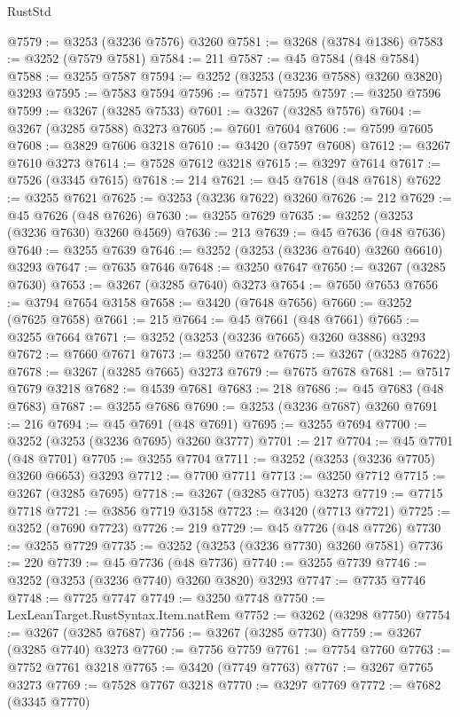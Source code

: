 \begin{lexlean}{RustStd}
\begin{coremodule}
{\begin{coremodule}
{{{{{{{{{{{{{{{{{{{{{{{{{{{{{{{{{{{{{{{@7579 := @3253 (@3236 @7576) @3260
@7581 := @3268 (@3784 @1386)
@7583 := @3252 (@7579 @7581)
@7584 := 211
@7587 := @45 @7584 (@48 @7584)
@7588 := @3255 @7587
@7594 := @3252 (@3253 (@3236 @7588) @3260 @3820) @3293
@7595 := @7583 @7594
@7596 := @7571 @7595
@7597 := @3250 @7596
@7599 := @3267 (@3285 @7533)
@7601 := @3267 (@3285 @7576)
@7604 := @3267 (@3285 @7588) @3273
@7605 := @7601 @7604
@7606 := @7599 @7605
@7608 := @3829 @7606 @3218
@7610 := @3420 (@7597 @7608)
@7612 := @3267 @7610 @3273
@7614 := @7528 @7612 @3218
@7615 := @3297 @7614
@7617 := @7526 (@3345 @7615)
@7618 := 214
@7621 := @45 @7618 (@48 @7618)
@7622 := @3255 @7621
@7625 := @3253 (@3236 @7622) @3260
@7626 := 212
@7629 := @45 @7626 (@48 @7626)
@7630 := @3255 @7629
@7635 := @3252 (@3253 (@3236 @7630) @3260 @4569)
@7636 := 213
@7639 := @45 @7636 (@48 @7636)
@7640 := @3255 @7639
@7646 := @3252 (@3253 (@3236 @7640) @3260 @6610) @3293
@7647 := @7635 @7646
@7648 := @3250 @7647
@7650 := @3267 (@3285 @7630)
@7653 := @3267 (@3285 @7640) @3273
@7654 := @7650 @7653
@7656 := @3794 @7654 @3158
@7658 := @3420 (@7648 @7656)
@7660 := @3252 (@7625 @7658)
@7661 := 215
@7664 := @45 @7661 (@48 @7661)
@7665 := @3255 @7664
@7671 := @3252 (@3253 (@3236 @7665) @3260 @3886) @3293
@7672 := @7660 @7671
@7673 := @3250 @7672
@7675 := @3267 (@3285 @7622)
@7678 := @3267 (@3285 @7665) @3273
@7679 := @7675 @7678
@7681 := @7517 @7679 @3218
@7682 := @4539 @7681
@7683 := 218
@7686 := @45 @7683 (@48 @7683)
@7687 := @3255 @7686
@7690 := @3253 (@3236 @7687) @3260
@7691 := 216
@7694 := @45 @7691 (@48 @7691)
@7695 := @3255 @7694
@7700 := @3252 (@3253 (@3236 @7695) @3260 @3777)
@7701 := 217
@7704 := @45 @7701 (@48 @7701)
@7705 := @3255 @7704
@7711 := @3252 (@3253 (@3236 @7705) @3260 @6653) @3293
@7712 := @7700 @7711
@7713 := @3250 @7712
@7715 := @3267 (@3285 @7695)
@7718 := @3267 (@3285 @7705) @3273
@7719 := @7715 @7718
@7721 := @3856 @7719 @3158
@7723 := @3420 (@7713 @7721)
@7725 := @3252 (@7690 @7723)
@7726 := 219
@7729 := @45 @7726 (@48 @7726)
@7730 := @3255 @7729
@7735 := @3252 (@3253 (@3236 @7730) @3260 @7581)
@7736 := 220
@7739 := @45 @7736 (@48 @7736)
@7740 := @3255 @7739
@7746 := @3252 (@3253 (@3236 @7740) @3260 @3820) @3293
@7747 := @7735 @7746
@7748 := @7725 @7747
@7749 := @3250 @7748
@7750 := LexLeanTarget.RustSyntax.Item.natRem
@7752 := @3262 (@3298 @7750)
@7754 := @3267 (@3285 @7687)
@7756 := @3267 (@3285 @7730)
@7759 := @3267 (@3285 @7740) @3273
@7760 := @7756 @7759
@7761 := @7754 @7760
@7763 := @7752 @7761 @3218
@7765 := @3420 (@7749 @7763)
@7767 := @3267 @7765 @3273
@7769 := @7528 @7767 @3218
@7770 := @3297 @7769
@7772 := @7682 (@3345 @7770)
}}}}}}}}}}}}}}}}}}}}}}}}}}}}}}}}}}}}}}}
\end{coremodule}}
\end{coremodule}
\end{lexlean}
